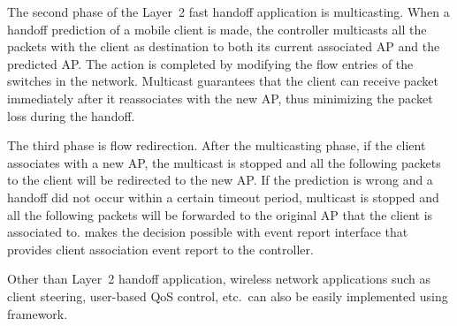 
The second phase of the Layer~2 fast handoff application is multicasting. When a
handoff prediction of a mobile client is made, the controller multicasts all the
packets with the client as destination to both its current associated AP and the
predicted AP. The action is completed by
modifying the flow entries of the switches in the network. Multicast guarantees
that the client can receive packet immediately after it reassociates with the
new AP, thus minimizing the packet loss during the handoff.

The third phase is flow redirection. After the multicasting phase, if the client
associates with a new AP, the multicast is stopped and all the following packets
to the client will be redirected to the new AP. If the prediction is wrong and a
handoff did not occur within a certain timeout period, multicast is stopped and
all the following packets will be forwarded to the original AP that the client
is associated to. \aetherflow makes the decision possible with event report
interface that provides client association event report to the controller.

Other than Layer~2 handoff application, wireless network applications such as
client steering, user-based QoS control, etc.\ can also be easily implemented
using \aetherflow framework.

